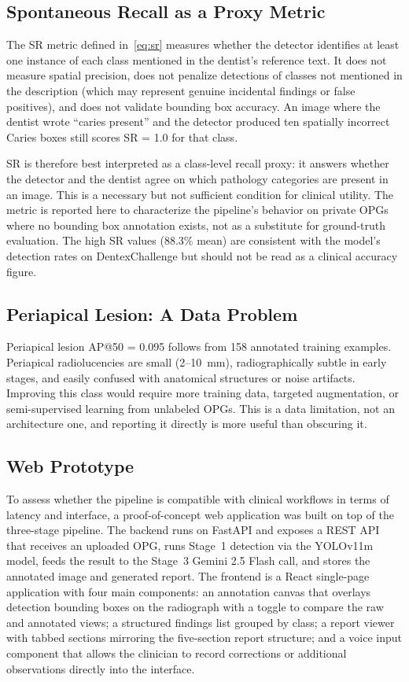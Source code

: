 \documentclass[conference]{IEEEtran}
\begin{document}
\subsection{Spontaneous Recall as a Proxy Metric}

The SR metric defined in~\eqref{eq:sr} measures whether the detector identifies at least one instance of each class mentioned in the dentist's reference text. It does not measure spatial precision, does not penalize detections of classes not mentioned in the description (which may represent genuine incidental findings or false positives), and does not validate bounding box accuracy. An image where the dentist wrote ``caries present'' and the detector produced ten spatially incorrect Caries boxes still scores SR = 1.0 for that class.

SR is therefore best interpreted as a class-level recall proxy: it answers whether the detector and the dentist agree on which pathology categories are present in an image. This is a necessary but not sufficient condition for clinical utility. The metric is reported here to characterize the pipeline's behavior on private OPGs where no bounding box annotation exists, not as a substitute for ground-truth evaluation. The high SR values (88.3\% mean) are consistent with the model's detection rates on DentexChallenge but should not be read as a clinical accuracy figure.

\subsection{Periapical Lesion: A Data Problem}

Periapical lesion AP@50 = 0.095 follows from 158 annotated training examples. Periapical radiolucencies are small (2--10~mm), radiographically subtle in early stages, and easily confused with anatomical structures or noise artifacts. Improving this class would require more training data, targeted augmentation, or semi-supervised learning from unlabeled OPGs. This is a data limitation, not an architecture one, and reporting it directly is more useful than obscuring it.

\subsection{Web Prototype}

To assess whether the pipeline is compatible with clinical workflows in terms of latency and interface, a proof-of-concept web application was built on top of the three-stage pipeline. The backend runs on FastAPI and exposes a REST API that receives an uploaded OPG, runs Stage~1 detection via the YOLOv11m model, feeds the result to the Stage~3 Gemini 2.5 Flash call, and stores the annotated image and generated report. The frontend is a React single-page application with four main components: an annotation canvas that overlays detection bounding boxes on the radiograph with a toggle to compare the raw and annotated views; a structured findings list grouped by class; a report viewer with tabbed sections mirroring the five-section report structure; and a voice input component that allows the clinician to record corrections or additional observations directly into the interface.
\end{document}
